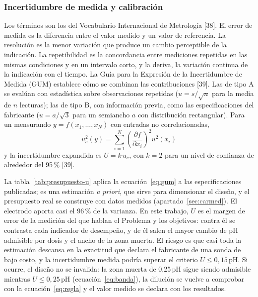 \begin{figure}[H]\centering
{}
\end{figure}

\subsubsection{Incertidumbre de medida y calibración}\label{sec:incertidumbre}
Los términos son los del Vocabulario Internacional de Metrología [38]. El error de medida es la diferencia entre el valor medido y un valor de referencia. La resolución es la menor variación que produce un cambio perceptible de la indicación. La repetibilidad es la concordancia entre mediciones repetidas en las mismas condiciones y en un intervalo corto, y la deriva, la variación continua de la indicación con el tiempo. La Guía para la Expresión de la Incertidumbre de Medida (GUM) establece cómo se combinan las contribuciones [39]. Las de tipo A se evalúan con estadística sobre observaciones repetidas ($u=s/\sqrt{n}$ para la media de $n$ lecturas); las de tipo B, con información previa, como las especificaciones del fabricante ($u=a/\sqrt{3}$ para un semiancho $a$ con distribución rectangular). Para un mensurando $y=f(x_1,\dots,x_N)$ con entradas no correlacionadas,
\begin{equation}
u_c^2(y)=\sum_{i=1}^{N}\left(\frac{\partial f}{\partial x_i}\right)^{2}u^2(x_i)\label{eq:gum}
\end{equation}
y la incertidumbre expandida es $U=k\,u_c$, con $k=2$ para un nivel de confianza de alrededor del 95\,\% [39].


La tabla~\ref{tab:presupuesto-u} aplica la ecuación~\eqref{eq:gum} a las especificaciones publicadas; es una estimación \emph{a priori}, que sirve para dimensionar el diseño, y el presupuesto real se construye con datos medidos (apartado~\ref{sec:carmed}). El electrodo aporta casi el 96\,\% de la varianza. En este trabajo, $U$ es el margen de error de la medición del que hablan el Problema y los objetivos: contra él se contrasta cada indicador de desempeño, y de él salen el mayor cambio de pH admisible por dosis y el ancho de la zona muerta. El riesgo es que casi toda la estimación descansa en la exactitud que declara el fabricante de una sonda de bajo costo, y la incertidumbre medida podría superar el criterio $U\le0{,}15$\,pH. Si ocurre, el diseño no se invalida: la zona muerta de 0,25\,pH sigue siendo admisible mientras $U\le0{,}25$\,pH (ecuación~\eqref{eq:banda}), la dilución se vuelve a comprobar con la ecuación~\eqref{eq:regla} y el valor medido se declara con los resultados.

